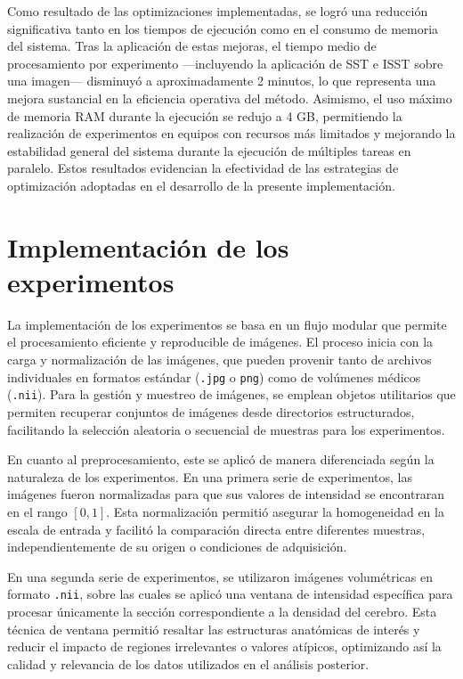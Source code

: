 Como resultado de las optimizaciones implementadas, se logró una reducción significativa tanto en los tiempos de ejecución como en el consumo de memoria del sistema. Tras la aplicación de estas mejoras, el tiempo medio de procesamiento por experimento —incluyendo la aplicación de SST e ISST sobre una imagen— disminuyó a aproximadamente 2 minutos, lo que representa una mejora sustancial en la eficiencia operativa del método. Asimismo, el uso máximo de memoria RAM durante la ejecución se redujo a 4 GB, permitiendo la realización de experimentos en equipos con recursos más limitados y mejorando la estabilidad general del sistema durante la ejecución de múltiples tareas en paralelo. Estos resultados evidencian la efectividad de las estrategias de optimización adoptadas en el desarrollo de la presente implementación.

\section{Implementación de los experimentos} \label{section:experiment-implementation}

La implementación de los experimentos se basa en un flujo modular que permite el procesamiento eficiente y reproducible de imágenes. El proceso inicia con la carga y normalización de las imágenes, que pueden provenir tanto de archivos individuales en formatos estándar (\texttt{.jpg} o \texttt{png}) como de volúmenes médicos (\texttt{.nii}). Para la gestión y muestreo de imágenes, se emplean objetos utilitarios que permiten recuperar conjuntos de imágenes desde directorios estructurados, facilitando la selección aleatoria o secuencial de muestras para los experimentos.

En cuanto al preprocesamiento, este se aplicó de manera diferenciada según la naturaleza de los experimentos. En una primera serie de experimentos, las imágenes fueron normalizadas para que sus valores de intensidad se encontraran en el rango $[0, 1]$. Esta normalización permitió asegurar la homogeneidad en la escala de entrada y facilitó la comparación directa entre diferentes muestras, independientemente de su origen o condiciones de adquisición.

En una segunda serie de experimentos, se utilizaron imágenes volumétricas en formato \texttt{.nii}, sobre las cuales se aplicó una ventana de intensidad específica para procesar únicamente la sección correspondiente a la densidad del cerebro. Esta técnica de ventana permitió resaltar las estructuras anatómicas de interés y reducir el impacto de regiones irrelevantes o valores atípicos, optimizando así la calidad y relevancia de los datos utilizados en el análisis posterior.

